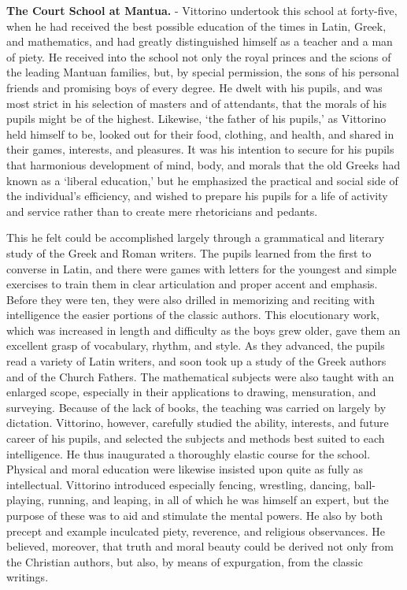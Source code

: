 \documentclass[
]{book}
\begin{document}
\textbf{The Court School at Mantua.} - Vittorino undertook this school at forty-five, when he had received the best possible education of the times in Latin, Greek, and mathematics, and had greatly distinguished himself as a teacher and a man of piety. He received into the school not only the royal princes and the scions of the leading Mantuan families, but, by special permission, the sons of his personal friends and promising boys of every degree. He dwelt with his pupils, and was most strict in his selection of masters and of attendants, that the morals of his pupils might be of the highest. Likewise, `the father of his pupils,' as Vittorino held himself to be, looked out for their food, clothing, and health, and shared in their games, interests, and pleasures. It was his intention to secure for his pupils that harmonious development of mind, body, and morals that the old Greeks had known as a `liberal education,' but he emphasized the practical and social side of the individual's efficiency, and wished to prepare his pupils for a life of activity and service rather than to create mere rhetoricians and pedants.

This he felt could be accomplished largely through a grammatical and literary study of the Greek and Roman writers. The pupils learned from the first to converse in Latin, and there were games with letters for the youngest and simple exercises to train them in clear articulation and proper accent and emphasis. Before they were ten, they were also drilled in memorizing and reciting with intelligence the easier portions of the classic authors. This elocutionary work, which was increased in length and difficulty as the boys grew older, gave them an excellent grasp of vocabulary, rhythm, and style. As they advanced, the pupils read a variety of Latin writers, and soon took up a study of the Greek authors and of the Church Fathers. The mathematical subjects were also taught with an enlarged scope, especially in their applications to drawing, mensuration, and surveying. Because of the lack of books, the teaching was carried on largely by dictation. Vittorino, however, carefully studied the ability, interests, and future career of his pupils, and selected the subjects and methods best suited to each intelligence. He thus inaugurated a thoroughly elastic course for the school. Physical and moral education were likewise insisted upon quite as fully as intellectual. Vittorino introduced especially fencing, wrestling, dancing, ball-playing, running, and leaping, in all of which he was himself an expert, but the purpose of these was to aid and stimulate the mental powers. He also by both precept and example inculcated piety, reverence, and religious observances. He believed, moreover, that truth and moral beauty could be derived not only from the Christian authors, but also, by means of expurgation, from the classic writings.
\end{document}
